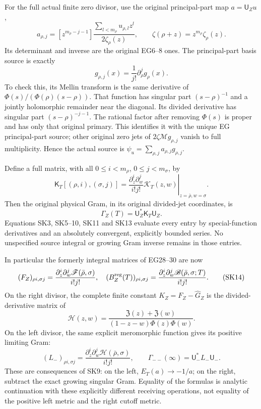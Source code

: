 \documentclass[11pt]{article}
\begin{document}
For the full actual finite zero divisor, use the original principal-part map \(a=\mathsf U_Zu\), \[
a_{\rho,j}=[z^{m_\rho-j-1}]
\frac{\sum_{l<m_\rho}u_{\rho,l}z^l}{2\zeta_\rho(z)},
\qquad \zeta(\rho+z)=z^{m_\rho}\zeta_\rho(z).
\tag{SK11}
\] Its determinant and inverse are the original EG6--8 ones. The principal-part basis source is exactly \[
g_{\rho,j}(x)=\frac1{j!}\partial_\rho^j g_\rho(x).
\tag{SK12}
\] To check this, its Mellin transform is the same derivative of \(\Phi(s)/(\Phi(\rho)(s-\rho))\). That function has singular part \((s-\rho)^{-1}\) and a jointly holomorphic remainder near the diagonal. Its divided derivative has singular part \((s-\rho)^{-j-1}\). The rational factor after removing \(\Phi(s)\) is proper and has only that original primary. This identifies it with the unique EG principal-part source; other original zero jets of \(2\zeta\mathcal M g_{\rho,j}\) vanish to full multiplicity. Hence the actual source is \(\psi_u=\sum_{\rho,j}a_{\rho,j}g_{\rho,j}\).

Define a full matrix, with all \(0\le i<m_\rho\), \(0\le j<m_\sigma\), by \[
\mathsf K_T[(\rho,i),(\sigma,j)]
=\left.\frac{\partial_z^i\partial_w^j}{i!j!}
\mathscr K_T(z,w)\right|_{z=\bar\rho,w=\sigma}.
\] Then the original physical Gram, in its original divided-jet coordinates, is \[
\boxed{\Gamma_Z(T)=\mathsf U_Z^*\mathsf K_T\mathsf U_Z.}
\tag{SK13}
\] Equations SK3, SK5--10, SK11 and SK13 evaluate every entry by special-function derivatives and an absolutely convergent, explicitly bounded series. No unspecified source integral or growing Gram inverse remains in those entries.

In particular the formerly integral matrices of EG28--30 are now \[
(F_Z)_{\rho i,\sigma j}
=\frac{\partial_z^i\partial_w^j\mathscr F(\bar\rho,\sigma)}{i!j!},
\quad (B_Z^{\rm reg}(T))_{\rho i,\sigma j}
=\frac{\partial_z^i\partial_w^j\mathscr B(\bar\rho,\sigma;T)}{i!j!}.
\tag{SK14}
\] On the right divisor, the complete finite constant \(K_Z=F_Z-\widehat G_Z\) is the divided-derivative matrix of \[
\boxed{\displaystyle
\mathscr H(z,w)=
\frac{\mathfrak Z(z)+\mathfrak Z(w)}{(1-z-w)\Phi(z)\Phi(w)}.}
\tag{SK15}
\] On the left divisor, the same explicit meromorphic function gives its positive limiting Gram: \[
\boxed{\displaystyle
(L_-)_{\rho i,\sigma j}
=\frac{\partial_z^i\partial_w^j\mathscr H(\bar\rho,\sigma)}{i!j!},
\qquad \Gamma_{--}(\infty)=\mathsf U_-^*L_-\mathsf U_-.}
\tag{SK16}
\] These are consequences of SK9: on the left, \(E_T(a)\to-1/a\); on the right, subtract the exact growing singular Gram. Equality of the formulas is analytic continuation with these explicitly different receiving operations, not equality of the positive left metric and the right cutoff metric.
\end{document}
